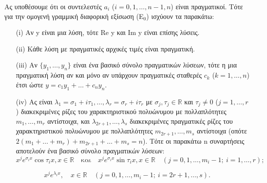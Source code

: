 \documentclass[11pt,a4paper,twoside]{book}
\newcommand{\titlefont}[1]{{\fontfamily{maksf}\selectfont #1}}
\newcounter{thewrhma}[chapter]
\renewcommand{\thethewrhma}{\thechapter.\arabic{thewrhma}}
\newcommand{\thewr}{\refstepcounter{thewrhma}{\bf\titlefont{\textcolor{secondarycolor}{\large Θεώρημα\hspace{2mm}\thethewrhma}}}\hspace{1mm}}{}
\newenvironment{Thewrhma}[1]
{\begin{tcolorbox}[title=\thewr\ \ :\ \  {\textcolor{black}{\bf{\large\titlefont{#1}}}},
breakable,
enhanced standard,
titlerule=-.2pt,
toprule=0pt, 
rightrule=0pt, 
bottomrule=0pt,
colback=white,
left=2mm,
top=1mm,
bottom=0mm,
boxrule=0pt,
colframe=white,
borderline west={1.5mm}{0pt}{secondarycolor},
leftrule=2mm,
sharp corners,
coltitle=secondarycolor]}
{\end{tcolorbox}}
\begin{document}
\begin{Thewrhma}{20.}
Ας υποθέσουμε ότι οι συντελεστές $a_i$ ($i=0,1,\dots,n-1,n$) είναι πραγματικοί. Τότε για την ομογενή γραμμική διαφορική εξίσωση (Ε$_0$) ισχύουν τα παρακάτω:
\begin{enumerate}
    \item[(i)] Αν y είναι μια λύση, τότε Re y και Im y είναι επίσης λύσεις.
    \item[(ii)] Κάθε λύση με πραγματικές αρχικές τιμές είναι πραγματική.
    \item[(iii)] Αν $\{y_1, \dots, y_n\}$ είναι ένα βασικό σύνολο πραγματικών λύσεων, τότε η μια πραγματική λύση αν και μόνο αν υπάρχουν πραγματικές σταθερές $c_k$ ($k=1,\dots,n$) έτσι ώστε $y=c_1y_1+\dots+c_ny_n$.
    \item[(iv)] Ας είναι $\lambda_1=\sigma_1+i\tau_1, \dots, \lambda_r=\sigma_r+i\tau_r$ με $\sigma_j, \tau_j\in\mathbb{R}$ και $\tau_j\neq 0$ ($j=1,\dots,r$) διακεκριμένες ρίζες του χαρακτηριστικού πολυώνυμου με πολλαπλότητες $m_1, \dots, m_r$ αντίστοιχα, και $\lambda_{2r+1}, \dots, \lambda_s$ διακεκριμένες πραγματικές ρίζες του χαρακτηριστικού πολυώνυμου με πολλαπλότητες $m_{2r+1}, \dots, m_s$ αντίστοιχα (οπότε $2(m_1+\dots+m_r)+m_{2r+1}+\dots+m_s=n$). Τότε οι παρακάτω n συναρτήσεις αποτελούν ένα βασικό σύνολο πραγματικών λύσεων:
    \[
        x^j e^{\sigma_i x}\cos\tau_i x, x\in\mathbb{R} \quad \text{και} \quad x^j e^{\sigma_i x}\sin\tau_i x, x\in\mathbb{R} \quad (j=0,1,\dots,m_i-1; \ i=1,\dots,r);
    \]
\end{enumerate}

\[
    x^j e^{\lambda_i x}, \quad x\in\mathbb{R} \quad (j=0,1,\dots,m_i-1; \ i=2r+1,\dots,s).
\]
\end{Thewrhma}
\end{document}
